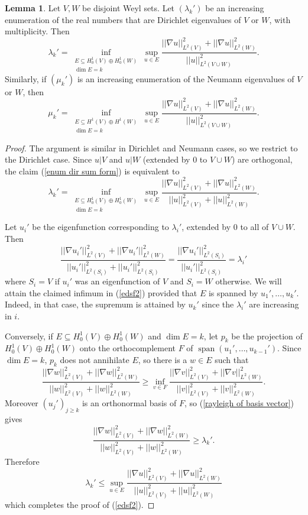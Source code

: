 \documentclass[10pt]{article}
\newcommand{\spn}{\operatorname{span}}
\theoremstyle{definition}
\newtheorem{lemma}{Lemma}[exer]
\begin{document}
\begin{lemma}
\label{enumerate direct sum}
Let $V, W$ be disjoint Weyl sets. Let $(\lambda_k')$ be an increasing enumeration of the real numbers that are Dirichlet eigenvalues of $V$ or $W$, with multiplicity. Then
\begin{equation}
\label{enum dir sum form}
\lambda_k' = \inf_{\substack{E \subseteq H_0^1(V) \oplus H_0^1(W)\\\dim E = k}} \sup_{u \in E} \frac{||\nabla u||_{L^2(V)}^2 + ||\nabla u||_{L^2(W)}^2}{||u||_{L^2(V \cup W)}^2}.
\end{equation}
Similarly, if $(\mu_k')$ is an increasing enumeration of the Neumann eigenvalues of $V$ or $W$, then
$$\mu_k' = \inf_{\substack{E \subseteq H^1(V) \oplus H^1(W)\\\dim E = k}} \sup_{u \in E} \frac{||\nabla u||_{L^2(V)}^2 + ||\nabla u||_{L^2(W)}^2}{||u||_{L^2(V \cup W)}^2}.$$
\end{lemma}
\begin{proof}
The argument is similar in Dirichlet and Neumann cases, so we restrict to the Dirichlet case.
Since $u|V$ and $u|W$ (extended by $0$ to $V \cup W$) are orthogonal, the claim (\ref{enum dir sum form}) is equivalent to
\begin{equation}
\label{edsf2}
\lambda_k' = \inf_{\substack{E \subseteq H_0^1(V) \oplus H_0^1(W)\\\dim E = k}} \sup_{u \in E} \frac{||\nabla u||_{L^2(V)}^2 + ||\nabla u||_{L^2(W)}^2}{||u||_{L^2(V)}^2 + ||u||_{L^2(W)}^2}.
\end{equation}

Let $u_i'$ be the eigenfunction corresponding to $\lambda_i'$, extended by $0$ to all of $V \cup W$.
Then
\begin{equation}
\label{rayleigh of basis vector}
\frac{||\nabla u_i'||_{L^2(V)}^2 + ||\nabla u_i'||_{L^2(W)}^2}{||u_i'||_{L^2(S_i)}^2 + ||u_i'||_{L^2(S_i)}^2} = \frac{||\nabla u_i'||_{L^2(S_i)}^2}{||u_i'||_{L^2(S_i)}^2} = \lambda_i'
\end{equation}
where $S_i = V$ if $u_i'$ was an eigenfunction of $V$ and $S_i = W$ otherwise.
We will attain the claimed infimum in (\ref{edsf2}) provided that $E$ is spanned by $u_1', \dots, u_k'$. Indeed, in that case, the supremum is attained by $u_k'$ since the $\lambda_i'$ are increasing in $i$.

Conversely, if $E \subseteq H_0^1(V) \oplus H_0^1(W)$ and $\dim E = k$, let $p_k$ be the projection of $H^1_0(V) \oplus H^1_0(W)$ onto the orthocomplement $F$ of $\spn(u_1', \dots, u_{k-1}')$.
Since $\dim E = k$, $p_k$ does not annihilate $E$, so there is a $w \in E$ such that
$$\frac{||\nabla w||_{L^2(V)}^2 + ||\nabla w||_{L^2(W)}^2}{||w||_{L^2(V)}^2 + ||w||_{L^2(W)}^2} \geq \inf_{v \in F} \frac{||\nabla v||_{L^2(V)}^2 + ||\nabla v||_{L^2(W)}^2}{||v||_{L^2(V)}^2 + ||v||_{L^2(W)}^2}.$$
Moreover $(u_j')_{j \geq k}$ is an orthonormal basis of $F$, so (\ref{rayleigh of basis vector}) gives
$$\frac{||\nabla w||_{L^2(V)}^2 + ||\nabla w||_{L^2(W)}^2}{||w||_{L^2(V)}^2 + ||w||_{L^2(W)}^2} \geq \lambda_k'.$$
Therefore
$$\lambda_k' \leq \sup_{u \in E} \frac{||\nabla u||_{L^2(V)}^2 + ||\nabla u||_{L^2(W)}^2}{||u||_{L^2(V)}^2 + ||u||_{L^2(W)}^2}$$
which completes the proof of (\ref{edsf2}).
\end{proof}
\end{document}
